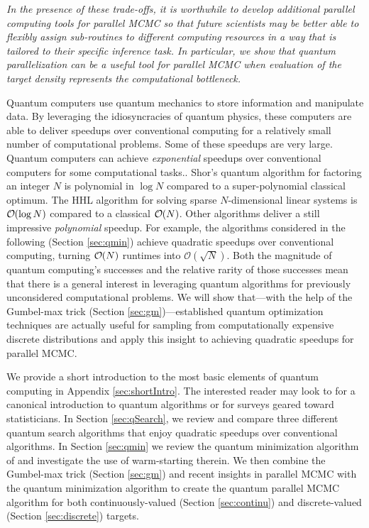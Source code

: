 \documentclass[12pt]{article} %
\newcommand{\order}[1]{{\cal O}\hspace{-0.2em}\left( #1 \right)}
\begin{document}
\emph{In the presence of these trade-offs, it is worthwhile to develop additional parallel computing tools for parallel MCMC so that future scientists may be better able to flexibly assign sub-routines to different computing resources in a way that is tailored to their specific inference task.  In particular, we show that quantum parallelization can be a useful tool for parallel MCMC when evaluation of the target density represents the computational bottleneck.}


Quantum computers use quantum mechanics to store information and manipulate data. By leveraging the idiosyncracies of quantum physics, these computers are able to deliver speedups over conventional computing for a relatively small number of computational problems. Some of these speedups are very large. Quantum computers can achieve \emph{exponential} speedups over conventional computers for some computational tasks..  Shor's quantum algorithm for factoring an integer $N$ \citep{shor} is polynomial in $\log N$ compared to a super-polynomial classical optimum. The HHL algorithm for solving sparse $N$-dimensional linear systems \citep{harrow2009quantum} is $\order{\log N}$ compared to a classical $\order{N}$. Other algorithms deliver a still impressive \emph{polynomial} speedup.  For example, the algorithms considered in the following (Section \ref{sec:qmin}) achieve quadratic speedups over conventional computing, turning  $\order{N}$ runtimes into $\mathcal{O}(\sqrt{ N})$.  
 Both the magnitude of quantum computing's successes and the relative rarity of those successes mean that there is a general interest in leveraging quantum algorithms for previously unconsidered computational problems.  We will show that---with the help of the Gumbel-max trick (Section \ref{sec:gm})---established quantum optimization techniques are actually useful for sampling from computationally expensive discrete distributions and apply this insight to achieving quadratic speedups for parallel MCMC. 

We provide a short introduction to the most basic elements of quantum computing in Appendix \ref{sec:shortIntro}. The interested reader may look to \citet{nielsen2002quantum} for a canonical introduction to quantum algorithms or \citet{lopatnikova2021introduction,wang2022quantum} for surveys geared toward statisticians.   In Section \ref{sec:qSearch}, we review and compare three different quantum search algorithms that enjoy quadratic speedups over conventional algorithms.  In Section \ref{sec:qmin} we review the quantum minimization algorithm of \citet{durr1996quantum} and investigate the use of warm-starting therein.  We then combine the Gumbel-max trick (Section \ref{sec:gm}) and recent insights in parallel MCMC with the quantum minimization algorithm to create the quantum parallel MCMC algorithm for both continuously-valued (Section \ref{sec:continu}) and discrete-valued (Section \ref{sec:discrete}) targets. 
\end{document}
